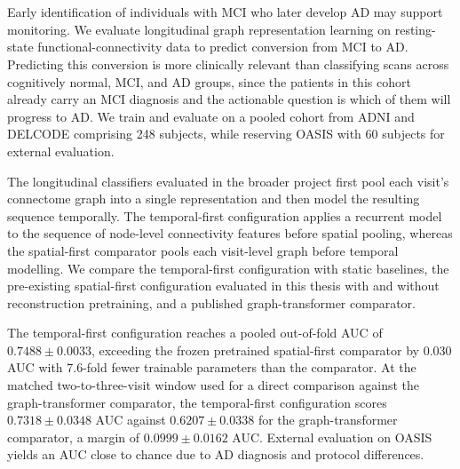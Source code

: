 \chapter{\abstractname}

Early identification of individuals with \ac{MCI} who later develop \ac{AD} may support
monitoring. We evaluate longitudinal graph representation learning on resting-state
functional-connectivity data to predict conversion from \ac{MCI} to \ac{AD}. Predicting
this conversion is more clinically relevant than classifying scans across cognitively
normal, \ac{MCI}, and \ac{AD} groups, since the patients in this cohort already carry an
\ac{MCI} diagnosis and the actionable question is which of them will progress to \ac{AD}.
We train and evaluate on a pooled cohort from \ac{ADNI} and \ac{DELCODE} comprising 248
subjects, while reserving \ac{OASIS} with 60 subjects for external evaluation.

The longitudinal classifiers evaluated in the broader project first pool each visit's
connectome graph into a single representation and then model the resulting sequence
temporally. The temporal-first configuration applies a recurrent model to the sequence of
node-level connectivity features before spatial pooling, whereas the spatial-first
comparator pools each visit-level graph before temporal modelling. We compare the
temporal-first configuration with static baselines, the pre-existing spatial-first
configuration evaluated in this thesis with and without reconstruction pretraining, and a
published graph-transformer comparator.

The temporal-first configuration reaches a pooled out-of-fold \ac{AUC} of
$0.7488 \pm 0.0033$, exceeding the frozen pretrained spatial-first comparator by 0.030
\ac{AUC} with 7.6-fold fewer trainable parameters than the comparator. At the matched
two-to-three-visit window used for a direct comparison against the graph-transformer
comparator, the temporal-first configuration scores $0.7318 \pm 0.0348$ \ac{AUC} against
$0.6207 \pm 0.0338$ for the graph-transformer comparator, a margin of
$0.0999 \pm 0.0162$ \ac{AUC}. External evaluation on \ac{OASIS} yields an \ac{AUC} close
to chance due to AD diagnosis and protocol differences.
